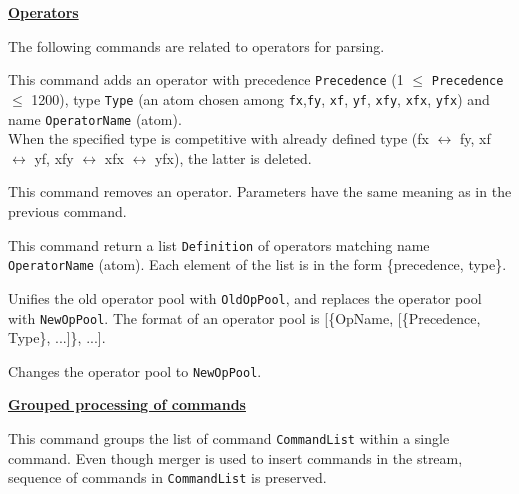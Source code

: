 \noindent\underline{\bf Operators}\vspace{1ex}\par
{}
The following commands are related to operators for parsing.
\begin{itemize}

This command adds an operator with precedence \verb|Precedence| (1 $\leq$
\verb|Precedence| $\leq$ 1200), type \verb|Type| (an atom chosen among
\verb|fx|,\verb|fy|, \verb|xf|, \verb|yf|, \verb|xfy|, \verb|xfx|, \verb|yfx|)
and name \verb|OperatorName| (atom).\\
\Caution When the specified type is competitive with already defined type
(fx $\leftrightarrow$ fy, xf $\leftrightarrow$ yf, xfy $\leftrightarrow$ xfx 
$\leftrightarrow$ yfx), the latter is deleted.

This command removes an operator. Parameters have the same meaning as in
the previous command.

This command return a list \verb|Definition| of operators matching name
\verb|OperatorName| (atom). Each element of the list is in the form
\{precedence, type\}.

Unifies the old operator pool with \verb|OldOpPool|, and replaces the operator
pool with \verb|NewOpPool|. The format of an operator pool is
[\{OpName, [\{Precedence, Type\}, ...]\}, ...].

Changes the operator pool to \verb|NewOpPool|.

\end{itemize}
\vspace{1ex}

\noindent\underline{\bf Grouped processing of commands}\vspace{1ex}\par
{}
\begin{itemize}

This command groups the list of command \verb|CommandList| within
a single command. Even though merger is used to insert commands in the stream,
sequence of commands in \verb|CommandList| is preserved.

\end{itemize}
\vspace{1ex}

